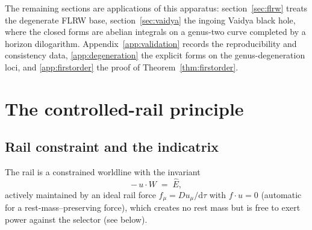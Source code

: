\documentclass[12pt]{iopart}
\newcommand{\Ehat}{\hat E}
\newcommand{\dd}{\mathrm{d}}
\theoremstyle{plain}
\theoremstyle{definition}
\theoremstyle{plain}
\theoremstyle{remark}
\begin{document}
The remaining sections are applications of this apparatus: section~\ref{sec:flrw} treats
the degenerate FLRW base, section~\ref{sec:vaidya} the ingoing Vaidya black hole, where
the closed forms are abelian integrals on a genus-two curve completed by a horizon
dilogarithm. Appendix~\ref{app:validation} records the reproducibility and consistency
data, \ref{app:degeneration} the explicit forms on the genus-degeneration loci, and
\ref{app:firstorder} the proof of Theorem~\ref{thm:firstorder}.

\section{The controlled-rail principle}
\label{sec:principle}

\subsection{Rail constraint and the indicatrix}
\label{sec:indicatrix}
The rail is a constrained worldline with the invariant
\begin{equation}
    -\,u\cdot W \;=\; \Ehat ,
    \label{eq:rail}
\end{equation}
actively maintained by an ideal rail force $f_\mu=Du_\mu/\dd\tau$ with
$f\cdot u=0$ (automatic for a rest-mass--preserving force), which creates no rest
mass but is free to exert power against the selector (see below).
\end{document}
